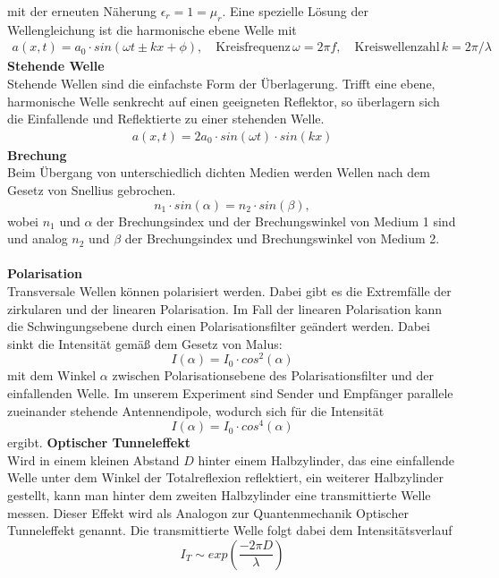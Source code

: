 \documentclass[12pt,a4paper]{article}
\begin{document}
mit der erneuten Näherung $\epsilon_r = 1 = \mu_r$.
Eine spezielle Lösung der Wellengleichung ist die harmonische ebene Welle mit 
\begin{align*}
a(x,t)=a_0 \cdot sin(\omega t \pm kx + \phi) , \quad \text{Kreisfrequenz} \, \omega = 2\pi f, \quad \text{Kreiswellenzahl} \, k= 2\pi / \lambda
\end{align*}
\textbf{Stehende Welle} \\
Stehende Wellen sind die einfachste Form der Überlagerung. Trifft eine ebene, harmonische Welle senkrecht auf einen geeigneten Reflektor, so überlagern sich die Einfallende und Reflektierte zu einer stehenden Welle. 
\begin{align*}
a(x,t)=2a_0 \cdot sin(\omega t)\cdot sin(kx)
\end{align*}
\textbf{Brechung} \\
Beim Übergang von unterschiedlich dichten Medien werden Wellen nach dem Gesetz von Snellius gebrochen.
\begin{equation}
n_1 \cdot sin(\alpha) = n_2 \cdot sin(\beta),
\end{equation}
wobei $n_1$ und $\alpha$ der Brechungsindex und der Brechungswinkel von Medium 1 sind und analog $n_2$ und $\beta$ der Brechungsindex und Brechungswinkel von Medium 2.\\\\ 
\textbf{Polarisation} \\
Transversale Wellen können polarisiert werden. Dabei gibt es die Extremfälle der zirkularen und der linearen Polarisation. Im Fall der linearen Polarisation kann die Schwingungsebene durch einen Polarisationsfilter geändert werden. Dabei sinkt die Intensität gemäß dem Gesetz von Malus:
\begin{equation}
I(\alpha) = I_0 \cdot cos^{2}(\alpha)
\end{equation}
mit dem Winkel $\alpha$ zwischen Polarisationsebene des Polarisationsfilter und der einfallenden Welle.
Im unserem Experiment sind Sender und Empfänger parallele zueinander stehende Antennendipole, wodurch sich für die Intensität
\begin{equation}
I(\alpha) = I_0 \cdot cos^{4}(\alpha)
\end{equation}
ergibt. \newline \newline
\textbf{Optischer Tunneleffekt} \\
Wird in einem kleinen Abstand $D$ hinter einem Halbzylinder, das eine einfallende Welle unter dem Winkel der Totalreflexion reflektiert, ein weiterer Halbzylinder gestellt, kann man hinter dem zweiten Halbzylinder eine transmittierte Welle messen. Dieser Effekt wird als Analogon zur Quantenmechanik Optischer Tunneleffekt genannt.
Die transmittierte Welle folgt dabei dem Intensitätsverlauf
\begin{equation}
I_T \sim exp(\frac{-2\pi D}{\lambda})
\end{equation}
\end{document}
